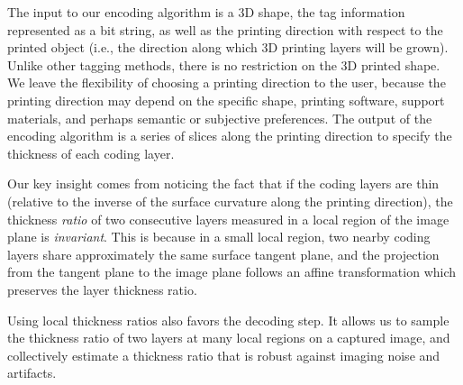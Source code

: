 \documentclass[12pt]{report}
\begin{document}
The input to our encoding algorithm is a 3D shape, the tag information
represented as a bit string, as well as the printing direction with
respect to the printed object
(i.e., the direction along which 3D printing layers will be grown). 
Unlike other tagging methods, there is no restriction on the 3D printed shape.
We leave the flexibility of choosing a printing direction to the user,
because the printing direction may depend on the specific shape, printing
software, support materials, and perhaps semantic or subjective preferences.
The output of the encoding algorithm is a series of slices along the printing
direction to specify the thickness of each coding layer.

Our key insight comes from noticing the fact that if the coding layers are thin
(relative to the inverse of the surface curvature along the printing direction),
the thickness \emph{ratio} of two consecutive layers measured in a local region
of the image plane is \emph{invariant}. This is because in a small local region,
two nearby coding layers share approximately the same surface tangent plane, and the
projection from the tangent plane to the image plane follows an affine
transformation which preserves the layer thickness ratio.

Using local thickness ratios also favors the decoding step. 
It allows us to sample the thickness
ratio of two layers at many local regions on a captured image, and collectively
estimate a thickness ratio that is robust against imaging noise and artifacts.
\end{document}
